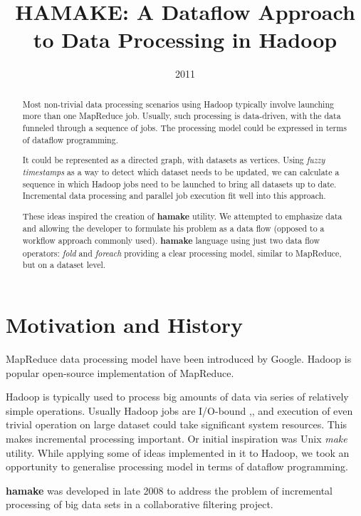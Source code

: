 \documentclass[10pt,conference,letterpaper]{IEEEtran}
\title{HAMAKE: A Dataflow Approach to Data Processing in Hadoop}
\author{\IEEEauthorblockN{Vadim Zaliva}
\IEEEauthorblockA{Codeminders\\
Email: lord@crocodile.org} \and \IEEEauthorblockN{Vladimir Orlov}
\IEEEauthorblockA{Codeminders\\
Email: vorl@codeminders.com}}
\date{2011}
\begin{document}
\lstset{language=XML,basicstyle=\tiny,markfirstintag=true}

\maketitle

\begin{abstract}
  Most non-trivial data processing scenarios using Hadoop typically
  involve launching more than one MapReduce job. Usually, such
  processing is data-driven, with the data funneled through a sequence
  of jobs. The processing model could be expressed in terms of
  dataflow programming.
  
  It could be represented as a directed graph, with datasets as
  vertices. Using \textit{fuzzy timestamps} as a way to detect which
  dataset needs to be updated, we can calculate a sequence in which
  Hadoop jobs need to be launched to bring all datasets up to
  date. Incremental data processing and parallel job execution fit
  well into this approach.

  These ideas inspired the creation of \textbf{hamake} utility. We
  attempted to emphasize data and allowing the developer to formulate
  his problem as a data flow (opposed to a workflow approach commonly
  used). \textbf{hamake} language using just two data flow operators:
  \emph{fold} and \emph{foreach} providing a clear processing model,
  similar to MapReduce, but on a dataset level.
\end{abstract}

\section{Motivation and History}

MapReduce data processing model have been introduced by
Google\cite{dean2008map}. Hadoop\cite{bialecki2005hadoop} is popular
open-source implementation of MapReduce.

Hadoop is typically used to process big amounts of data via series of
relatively simple operations. Usually Hadoop jobs are I/O-bound
\cite{hadoopattwitter},\cite{hs2010hadoopbench}, and execution of even
trivial operation on large dataset could take significant system
resources. This makes incremental processing important. Or initial
inspiration was Unix \emph{make} utility. While applying some of ideas
implemented in it to Hadoop, we took an opportunity to generalise
processing model in terms of dataflow programming.

\textbf{hamake} was developed in late 2008 to address the problem of
incremental processing of big data sets in a collaborative filtering
project.
\end{document}
